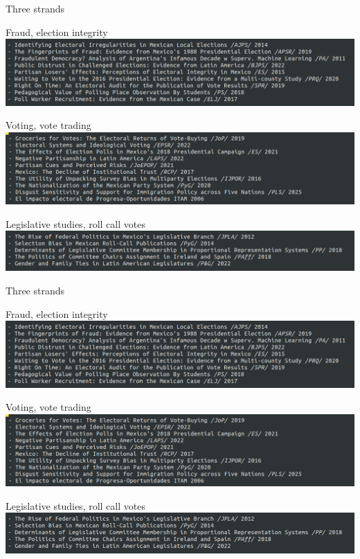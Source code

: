 \documentclass[bigger]{beamer}
\begin{document}
\begin{frame}[label={sec:org5e1ff4a}]{Three strands}
\begin{block}{Fraud, election integrity}
\includegraphics[width=\textwidth]{./pics/pubs1.png}
\end{block}
\begin{block}{Voting, vote trading}
\includegraphics[width=\textwidth]{./pics/pubs2.png}
\end{block}
\begin{block}{Legislative studies, roll call votes}
\includegraphics[width=\textwidth]{./pics/pubs3.png}
\end{block}
\end{frame}
\begin{frame}[label={sec:orga8b8a1f}]{Three strands}
\begin{block}{Fraud, election integrity}
\includegraphics[width=\textwidth]{./pics/pubs1.png}
\end{block}
\begin{block}{Voting, vote trading}
\includegraphics[width=\textwidth]{./pics/pubs2.png}
\end{block}
\begin{block}{Legislative studies, roll call votes}
\includegraphics[width=\textwidth]{./pics/pubs3.png}
\end{block}
\end{frame}
\end{document}
